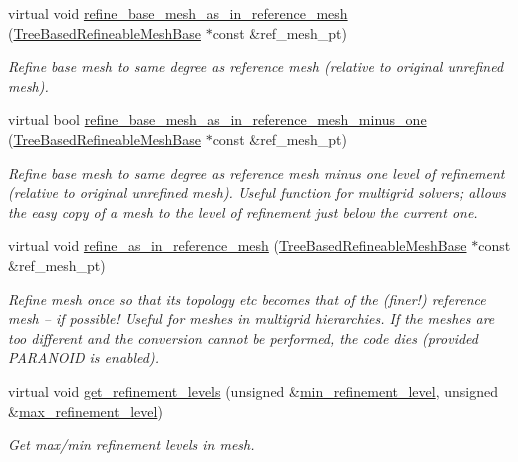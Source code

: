 \begin{DoxyCompactItemize}
virtual void \hyperlink{classoomph_1_1TreeBasedRefineableMeshBase_a6a69f5485eb426f6f60ed5a92db383a3}{refine\+\_\+base\+\_\+mesh\+\_\+as\+\_\+in\+\_\+reference\+\_\+mesh} (\hyperlink{classoomph_1_1TreeBasedRefineableMeshBase}{Tree\+Based\+Refineable\+Mesh\+Base} $\ast$const \&ref\+\_\+mesh\+\_\+pt)
\begin{DoxyCompactList}\small\item\em Refine base mesh to same degree as reference mesh (relative to original unrefined mesh). \end{DoxyCompactList}\item 
virtual bool \hyperlink{classoomph_1_1TreeBasedRefineableMeshBase_ae6fc7cc7acf368423cc49cc10ab276bc}{refine\+\_\+base\+\_\+mesh\+\_\+as\+\_\+in\+\_\+reference\+\_\+mesh\+\_\+minus\+\_\+one} (\hyperlink{classoomph_1_1TreeBasedRefineableMeshBase}{Tree\+Based\+Refineable\+Mesh\+Base} $\ast$const \&ref\+\_\+mesh\+\_\+pt)
\begin{DoxyCompactList}\small\item\em Refine base mesh to same degree as reference mesh minus one level of refinement (relative to original unrefined mesh). Useful function for multigrid solvers; allows the easy copy of a mesh to the level of refinement just below the current one. \end{DoxyCompactList}\item 
virtual void \hyperlink{classoomph_1_1TreeBasedRefineableMeshBase_a7451ff312a3ac482b2f62ded020630c3}{refine\+\_\+as\+\_\+in\+\_\+reference\+\_\+mesh} (\hyperlink{classoomph_1_1TreeBasedRefineableMeshBase}{Tree\+Based\+Refineable\+Mesh\+Base} $\ast$const \&ref\+\_\+mesh\+\_\+pt)
\begin{DoxyCompactList}\small\item\em Refine mesh once so that its topology etc becomes that of the (finer!) reference mesh -- if possible! Useful for meshes in multigrid hierarchies. If the meshes are too different and the conversion cannot be performed, the code dies (provided P\+A\+R\+A\+N\+O\+ID is enabled). \end{DoxyCompactList}\item 
virtual void \hyperlink{classoomph_1_1TreeBasedRefineableMeshBase_a937e4321288b6642d5057498f7659d76}{get\+\_\+refinement\+\_\+levels} (unsigned \&\hyperlink{classoomph_1_1TreeBasedRefineableMeshBase_af3974421171e1bb10daf6864f0749675}{min\+\_\+refinement\+\_\+level}, unsigned \&\hyperlink{classoomph_1_1TreeBasedRefineableMeshBase_a18bf22913dc5daf45fb3995d9ec30bfc}{max\+\_\+refinement\+\_\+level})
\begin{DoxyCompactList}\small\item\em Get max/min refinement levels in mesh. \end{DoxyCompactList}\item 

\end{DoxyCompactItemize}
